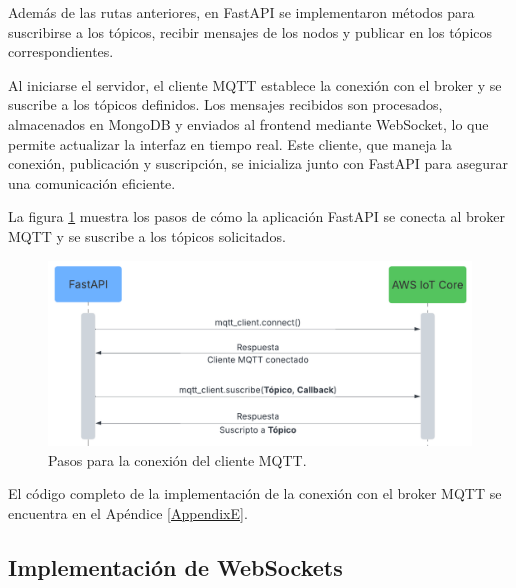 Además de las rutas anteriores, en FastAPI se implementaron métodos para
suscribirse a los tópicos, recibir mensajes de los nodos y publicar en los
tópicos correspondientes.

Al iniciarse el servidor, el cliente MQTT establece la conexión con el broker y
se suscribe a los tópicos definidos. Los mensajes recibidos son procesados,
almacenados en MongoDB y enviados al frontend mediante WebSocket, lo que
permite actualizar la interfaz en tiempo real. Este cliente, que maneja la
conexión, publicación y suscripción, se inicializa junto con FastAPI para
asegurar una comunicación eficiente.

La figura \ref{fig:cliente_mqtt} muestra los pasos de cómo la aplicación
FastAPI se conecta al broker MQTT y se suscribe a los tópicos solicitados.

\begin{figure}[H]
    \centering
    \includegraphics[width=.75\textwidth]{./Images/22.png}
    \caption{Pasos para la conexión del cliente MQTT.}
    \label{fig:cliente_mqtt}
\end{figure}



El código completo de la implementación de la conexión con el broker MQTT se
encuentra en el Apéndice \ref{AppendixE}.

\subsection{Implementación de WebSockets}


